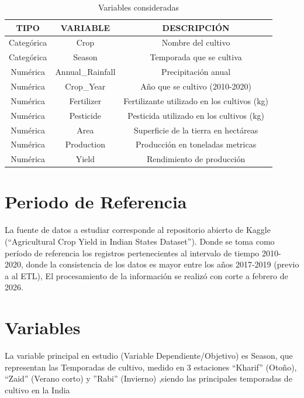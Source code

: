 \documentclass[oneside,11pt]{Latex/Classes/PhDthesisPSnPDF}
\begin{document}
\begin{table}[ht]
\centering
\caption{Variables consideradas} 
\resizebox{10cm}{!} {
\begin{tabular}{ccc}
  \hline
  \textbf{TIPO} & \textbf{VARIABLE} & \textbf{DESCRIPCIÓN} \\ 
  \hline
  Categórica & Crop & Nombre del cultivo \\ 
  Categórica & Season & Temporada que se cultiva\\ 
  Numérica & Annual\_Rainfall & Precipitación anual \\ 
    Numérica & Crop\_Year & Año que se cultivo (2010-2020) \\ 
    Numérica & Fertilizer & Fertilizante utilizado en los cultivos (kg)   \\ 
    Numérica & Pesticide & Pesticida utilizado en los cultivos (kg) \\ 
    Numérica & Area & Superficie de la tierra en hectáreas   \\ 
    Numérica & Production &  Producción en toneladas metricas   \\ 
    Numérica &  Yield  & Rendimiento de producción    \\ 
 


   \hline
\end{tabular}
}
\end{table}

\section{Periodo de Referencia}

La fuente de datos a estudiar corresponde al repositorio abierto de
Kaggle (``Agricultural Crop Yield in Indian States Dataset''). Donde se
toma como período de referencia los registros pertenecientes al
intervalo de tiempo 2010-2020, donde la consistencia de los datos es
mayor entre los años 2017-2019 (previo a al ETL), El procesamiento de la
información se realizó con corte a febrero de 2026.

\section{Variables}

La variable principal en estudio (Variable Dependiente/Objetivo) es
Season, que representan las Temporadas de cultivo, medido en 3
estaciones ``Kharif'' (Otoño), ``Zaid'' (Verano corto) y ''Rabi''
(Invierno) ,siendo las principales temporadas de cultivo en la India
\end{document}
